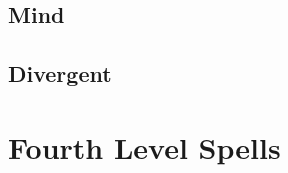\begin{multicols}{2}

\subsection{Mind}


\subsection{Divergent}



\end{multicols}

\section{Fourth Level Spells}

